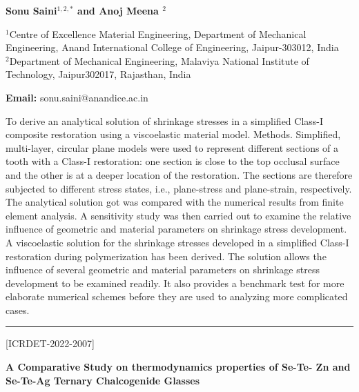 \documentclass[twoside,11pt]{amsart}
\begin{document}
\centerline{\textbf{Sonu Saini$^{1,2,*}$ and Anoj Meena
$^{2}$   }}
\vskip 5mm
\begin{flushleft}
$^{1}$Centre of Excellence Material Engineering, Department of Mechanical Engineering, Anand International College of Engineering, Jaipur-303012, India\\
$^{2}$Department of Mechanical Engineering, Malaviya National Institute of Technology, Jaipur302017, Rajasthan, India
\vskip 5mm
\end{flushleft}
\vskip 2mm
\begin{flushleft}
{\bf Email:} sonu.saini@anandice.ac.in
\end{flushleft}
\vskip 5mm
To derive an analytical solution of shrinkage stresses in a simplified Class-I composite restoration
using a viscoelastic material model. Methods. Simplified, multi-layer, circular plane models were
used to represent different sections of a tooth with a Class-I restoration: one section is close to the
top occlusal surface and the other is at a deeper location of the restoration. The sections are
therefore subjected to different stress states, i.e., plane-stress and plane-strain, respectively. The
analytical solution got was compared with the numerical results from finite element analysis. A
sensitivity study was then carried out to examine the relative influence of geometric and material
parameters on shrinkage stress development. A viscoelastic solution for the shrinkage stresses
developed in a simplified Class-I restoration during polymerization has been derived. The solution
allows the influence of several geometric and material parameters on shrinkage stress development
to be examined readily. It also provides a benchmark test for more elaborate numerical schemes
before they are used to analyzing more complicated cases.
\vskip 2mm
\rule{\textwidth}{0.5pt}
\vskip 5mm
\begin{flushleft}
\centerline{[ICRDET-2022-2007]}
\end{flushleft}
\begin{center}\bf\LARGE
A Comparative Study on thermodynamics properties of Se-Te- Zn and Se-Te-Ag Ternary Chalcogenide Glasses
\end{center}
\vskip 5mm
\end{document}
